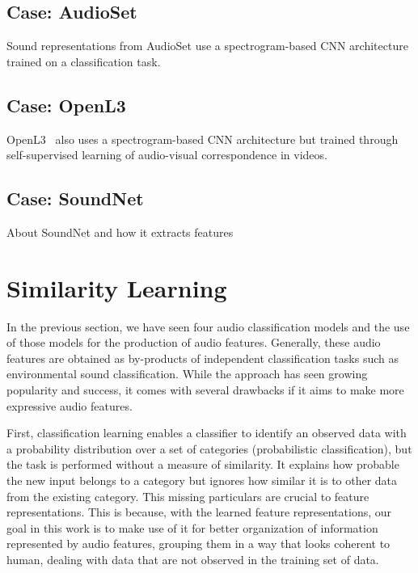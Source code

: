 \subsection{Case: AudioSet}
Sound representations  from AudioSet \cite{jort2017} use a spectrogram-based CNN architecture trained on a classification task.

\subsection{Case: OpenL3}
OpenL3~\cite{cramer2019} also uses a spectrogram-based CNN architecture but trained through self-supervised learning of audio-visual correspondence in videos.

\subsection{Case: SoundNet}
About SoundNet and how it extracts features

\section{Similarity Learning}
In the previous section, we have seen four audio classification models and the use of those models for the production of audio features. Generally, these audio features are obtained as by-products of independent classification tasks such as environmental sound classification. While the approach has seen growing popularity and success, it comes with several drawbacks if it aims to make more expressive audio features.

First, classification learning enables a classifier to identify an observed data with a probability distribution over a set of categories (probabilistic classification), but the task is performed without a measure of similarity. It explains how probable the new input belongs to a category but ignores how similar it is to other data from the existing category. This missing particulars are crucial to feature representations. This is because, with the learned feature representations, our goal in this work is to make use of it for better organization of information represented by audio features, grouping them in a way that looks coherent to human, dealing with data that are not observed in the training set of data.

